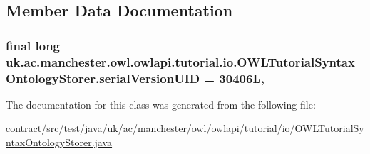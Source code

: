 \subsection{Member Data Documentation}
\hypertarget{classuk_1_1ac_1_1manchester_1_1owl_1_1owlapi_1_1tutorial_1_1io_1_1_o_w_l_tutorial_syntax_ontology_storer_acc8294f0e1eb3711403d61d7ff8ddb9f}{
\subsubsection[{serial\-Version\-U\-I\-D}]{\setlength{\rightskip}{0pt plus 5cm}final long uk.\-ac.\-manchester.\-owl.\-owlapi.\-tutorial.\-io.\-O\-W\-L\-Tutorial\-Syntax\-Ontology\-Storer.\-serial\-Version\-U\-I\-D = 30406\-L\hspace{0.3cm}{\ttfamily [static]}, {\ttfamily [private]}}}\label{classuk_1_1ac_1_1manchester_1_1owl_1_1owlapi_1_1tutorial_1_1io_1_1_o_w_l_tutorial_syntax_ontology_storer_acc8294f0e1eb3711403d61d7ff8ddb9f}


The documentation for this class was generated from the following file\-:\begin{DoxyCompactItemize}
\item 
contract/src/test/java/uk/ac/manchester/owl/owlapi/tutorial/io/\hyperlink{test_2java_2uk_2ac_2manchester_2owl_2owlapi_2tutorial_2io_2_o_w_l_tutorial_syntax_ontology_storer_8java}{O\-W\-L\-Tutorial\-Syntax\-Ontology\-Storer.\-java}\end{DoxyCompactItemize}
